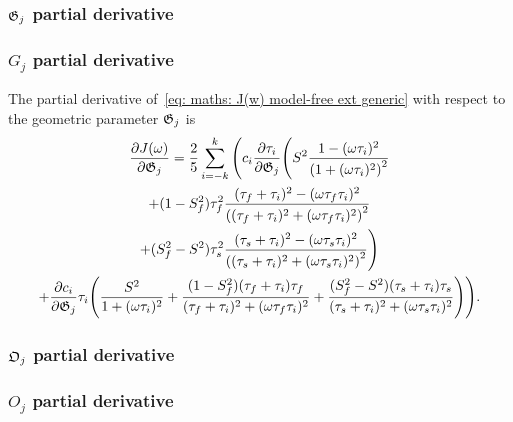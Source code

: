 \begin{latexonly}
    \subsubsection{$\mathfrak{G}_j$ partial derivative}
\end{latexonly}
\begin{htmlonly}
    \subsubsection{$G_j$ partial derivative}
\end{htmlonly}

The partial derivative of~\eqref{eq: maths: J(w) model-free ext generic} with respect to the geometric parameter $\mathfrak{G}_j$ is
\begin{multline}
    \frac{\partial J(\omega)}{\partial \mathfrak{G}_j} = \frac{2}{5} \sum_{i=-k}^k \Bigg(
        c_i \frac{\partial \tau_i}{\partial \mathfrak{G}_j} \Bigg(
            S^2 \frac{1 - (\omega \tau_i)^2}{\left(1 + (\omega \tau_i)^2 \right)^2} \\
            + (1 - S^2_f) \tau_f^2 \frac{(\tau_f + \tau_i)^2 - (\omega \tau_f \tau_i)^2}{\left((\tau_f + \tau_i)^2 + (\omega \tau_f \tau_i)^2 \right)^2} \\
            + (S^2_f - S^2) \tau_s^2 \frac{(\tau_s + \tau_i)^2 - (\omega \tau_s \tau_i)^2}{\left((\tau_s + \tau_i)^2 + (\omega \tau_s \tau_i)^2 \right)^2}
        \Bigg) \\
        +  \frac{\partial c_i}{\partial \mathfrak{G}_j} \tau_i \Bigg(
            \frac{S^2}{1 + (\omega \tau_i)^2}
            + \frac{(1 - S^2_f)(\tau_f + \tau_i)\tau_f}{(\tau_f + \tau_i)^2 + (\omega \tau_f \tau_i)^2}
            + \frac{(S^2_f - S^2)(\tau_s + \tau_i)\tau_s}{(\tau_s + \tau_i)^2 + (\omega \tau_s \tau_i)^2}
        \Bigg)
    \Bigg).
\end{multline}



\begin{latexonly}
    \subsubsection{$\mathfrak{O}_j$ partial derivative}
\end{latexonly}
\begin{htmlonly}
    \subsubsection{$O_j$ partial derivative}
\end{htmlonly}

